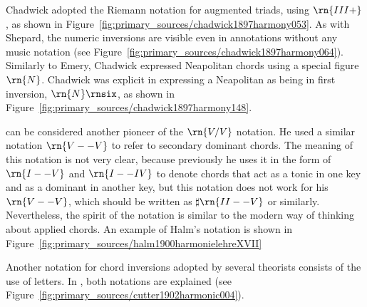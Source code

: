 




Chadwick adopted the Riemann notation for augmented triads, using $\rn{III+}$, as shown in Figure~\ref{fig:primary_sources/chadwick1897harmony053}.
As with Shepard, the numeric inversions are visible even in annotations without any music notation (see Figure~\ref{fig:primary_sources/chadwick1897harmony064}).
Similarly to Emery, Chadwick expressed Neapolitan chords using a special figure $\rn{N}$.
Chadwick was explicit in expressing a Neapolitan as being in first inversion, $\rn{N}\rnsix$, as shown in Figure~\ref{fig:primary_sources/chadwick1897harmony148}.

\textcite{halm1900harmonielehre} can be considered another pioneer of the $\rn{V/V}$ notation.
He used a similar notation $\rn{V--V}$ to refer to secondary dominant chords.
The meaning of this notation is not very clear, because previously he uses it in the form of $\rn{I--V}$ and $\rn{I--IV}$ to denote chords that act as a tonic in one key and as a dominant in another key, but this notation does not work for his $\rn{V--V}$, which should be written as $\sharp{}\rn{II--V}$ or similarly.
Nevertheless, the spirit of the notation is similar to the modern way of thinking about applied chords.
An example of Halm's notation is shown in Figure~\ref{fig:primary_sources/halm1900harmonielehreXVII}


Another notation for chord inversions adopted by several theorists consists of the use of letters.
In \textcite{cutter1902harmonic}, both notations are explained (see Figure~\ref{fig:primary_sources/cutter1902harmonic004}).

